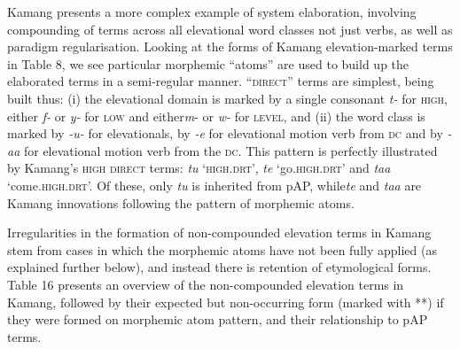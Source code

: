 \documentclass[output=paper]{LSP/langsci}
\begin{document}
Kamang presents a more complex example of system elaboration, involving compounding of terms across all elevational word classes not just verbs, as well as paradigm regularisation. Looking at the forms of Kamang elevation-marked terms in Table 8, we see particular morphemic ``atoms'' are used to build up the elaborated terms in a semi-regular manner. ``\textsc{direct}'' terms are simplest, being built thus: (i) the elevational domain is marked by a single consonant \textit{t-} for \textsc{high}, either \textit{f-} or \textit{y-} for \textsc{low} and either\textit m-  or \textit{w-} for \textsc{level}, and (ii) the word class is marked by \textit{{}-u-{\ng}} for elevationals, by \textit{{}-e} for elevational motion verb from \textsc{dc} and by \textit{{}-aa{\ng}} for elevational motion verb from the \textsc{dc}. This pattern is perfectly illustrated by Kamang's \textsc{high} \textsc{direct} terms: \textit{tu{\ng}} `\textsc{high.drt'}, \textit{te} `go.\textsc{high.drt'} and \textit{taa{\ng}} `come.\textsc{high.drt'.} \textsc {O}f these, only \textit{tu{\ng}} is inherited from pAP, while\textit{te} and \textit{taa{\ng}} are Kamang innovations following the pattern of morphemic atoms. 

Irregularities in the formation of non-compounded elevation terms in Kamang stem from cases in which the morphemic atoms have not been fully applied (as explained further below), and instead there is retention of etymological forms. Table 16 presents an overview of the non-compounded elevation terms in Kamang, followed by their expected but non-occurring form (marked with **) if they were formed on morphemic atom pattern, and their relationship to pAP terms.
 
\end{document}
